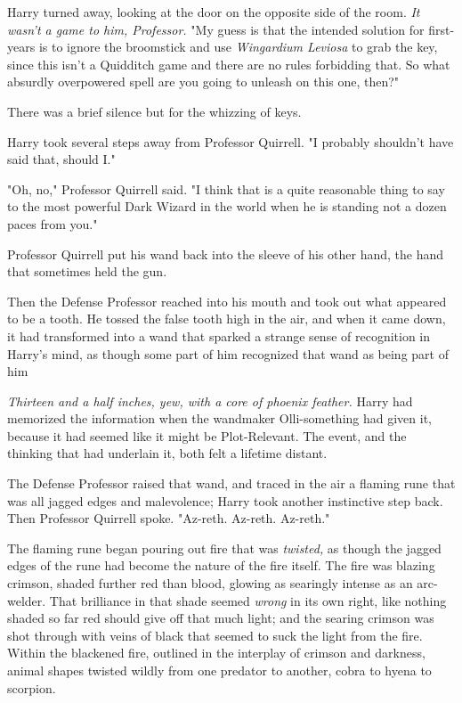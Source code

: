 Harry turned away, looking at the door on the opposite side of the room.
\emph{It wasn't a game to him, Professor.} "My guess is that the intended
solution for first-years is to ignore the broomstick and use \emph{Wingardium
Leviosa} to grab the key, since this isn't a Quidditch game and there are no
rules forbidding that. So what absurdly overpowered spell are you going to
unleash on this one, then?"

There was a brief silence but for the whizzing of keys.

Harry took several steps away from Professor Quirrell. "I probably shouldn't
have said that, should I."

"Oh, no," Professor Quirrell said. "I think that is a quite reasonable thing to
say to the most powerful Dark Wizard in the world when he is standing not a
dozen paces from you."

Professor Quirrell put his wand back into the sleeve of his other hand, the
hand that sometimes held the gun.

Then the Defense Professor reached into his mouth and took out what appeared to
be a tooth. He tossed the false tooth high in the air, and when it came down,
it had transformed into a wand that sparked a strange sense of recognition in
Harry's mind, as though some part of him recognized that wand as being{\el}
part of him{\el}

\emph{Thirteen and a half inches, yew, with a core of phoenix feather.} Harry
had memorized the information when the wandmaker Olli-something had given it,
because it had seemed like it might be Plot-Relevant. The event, and the
thinking that had underlain it, both felt a lifetime distant.

The Defense Professor raised that wand, and traced in the air a flaming rune
that was all jagged edges and malevolence; Harry took another instinctive step
back. Then Professor Quirrell spoke. "Az-reth. Az-reth. Az-reth."

The flaming rune began pouring out fire that was{\el} \emph{twisted,} as
though the jagged edges of the rune had become the nature of the fire itself.
The fire was blazing crimson, shaded further red than blood, glowing as
searingly intense as an arc-welder. That brilliance in that shade seemed
\emph{wrong} in its own right, like nothing shaded so far red should give off
that much light; and the searing crimson was shot through with veins of black
that seemed to suck the light from the fire. Within the blackened fire,
outlined in the interplay of crimson and darkness, animal shapes twisted wildly
from one predator to another, cobra to hyena to scorpion.

